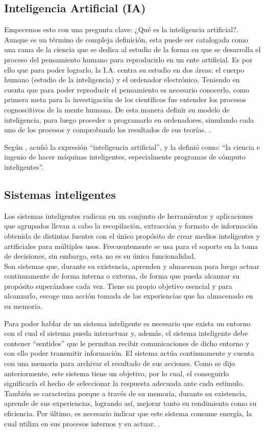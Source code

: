 \subsection{Inteligencia Artificial (IA)}
Empecemos esto con una pregunta clave: ¿Qué es la inteligencia artificial?. Aunque es un término de compleja definición, esta puede ser catalogada como una rama de la ciencia que se dedica al estudio de la forma en que se desarrolla el proceso del pensamiento humano para reproducirlo en un ente artificial. Es por ello que para poder lograrlo, la I.A. centra su estudio en dos áreas: el cuerpo humano (estudio de la inteligencia) y el ordenador electrónico. Teniendo en cuenta que para poder reproducir el pensamiento es necesario conocerlo, como primera meta para la investigación de los científicos fue entender los procesos cognoscitivos de la mente humana. De esta manera definir su modelo de inteligencia, para luego proceder a programarlo en ordenadores, simulando cada uno de los procesos y comprobando los resultados de sus teorías. \citep{Belzebu2009}. 

Según \cite{mccarthy1989artificial}, acuñó la expresión ``inteligencia artificial'', y la definió como: ``la ciencia e ingenio de hacer máquinas inteligentes, especialmente programas de cómputo inteligentes''.

\subsection{Sistemas inteligentes}
Los sistemas inteligentes radican en un conjunto de herramientas y aplicaciones que agrupados llevan a cabo la recopilación, extracción y formato de información obtenida de distintas fuentes con el único propósito de crear medios inteligentes y artificiales para múltiples usos. Frecuentemente se usa para el soporte en la toma de decisiones, sin embargo, esta no es su única funcionalidad.\\
Son sistemas que, durante su existencia, aprenden y almacenan para luego actuar continuamente de forma interna o externa, de forma que pueda alcanzar su propósito superándose cada vez. Tiene su propio objetivo esencial y para alcanzarlo, escoge una acción tomada de las experiencias que   ha almacenado en su memoria.

Para poder hablar de un sistema inteligente es necesario que exista un entorno con el cual el sistema pueda interactuar y, además, el sistema inteligente debe contener ``sentidos'' que le permitan recibir comunicaciones de dicho entorno y con ello poder transmitir información. El sistema actúa continuamente   y cuenta con una memoria para archivar el resultado de sus acciones. 
Como se dijo anteriormente, este sistema tiene un objetivo, por lo cual, el conseguirlo significaría el hecho de seleccionar la respuesta adecuada ante cada estimulo. También se caracteriza porque a través de su memoria, durante su existencia, aprende de sus experiencias, logrando así, mejorar tanto su rendimiento como su eficiencia. Por último, es necesario indicar que este sistema consume energía, la cual   utiliza en sus procesos internos y su actuar. \citep{Alejandro2017}.

